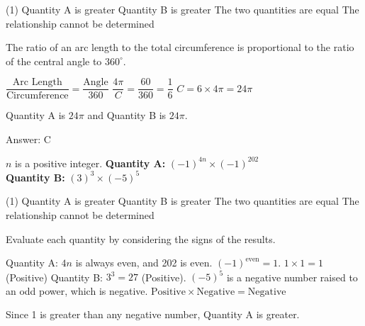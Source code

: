 \documentclass[11pt,paper=a4,answers]{exam}
\begin{document}
\begin{questions}
\begin{tasks}(1)
\task[A)] Quantity A is greater
\task[B)] Quantity B is greater
\task[C)] The two quantities are equal
\task[D)] The relationship cannot be determined
\end{tasks}

\begin{solution}
The ratio of an arc length to the total circumference is proportional to the ratio of the central angle to $360^\circ$.
\vspace{5pt}
\begin{center}
$\dfrac{\text{Arc Length}}{\text{Circumference}} = \dfrac{\text{Angle}}{360}$
\vspace{5pt}
$\dfrac{4\pi}{C} = \dfrac{60}{360} = \dfrac{1}{6}$
\vspace{5pt}
$C = 6 \times 4\pi = 24\pi$
\end{center}
\vspace{5pt}
Quantity A is $24\pi$ and Quantity B is $24\pi$.

Answer: \colorbox{yellow!100}{C}
\end{solution}

\vspace{1cm}

\question
$n$ is a positive integer.
\vspace{5pt}
\textbf{Quantity A: } $(-1)^{4n} \times (-1)^{202}$ \\
\vspace{5pt}
\textbf{Quantity B: } $(3)^3 \times (-5)^5$

\begin{tasks}(1)
\task[A)] Quantity A is greater
\task[B)] Quantity B is greater
\task[C)] The two quantities are equal
\task[D)] The relationship cannot be determined
\end{tasks}

\begin{solution}
Evaluate each quantity by considering the signs of the results.
\vspace{5pt}
\begin{center}
Quantity A: $4n$ is always even, and 202 is even. $(-1)^{\text{even}} = 1$.
\vspace{5pt}
$1 \times 1 = 1$ (Positive)
\vspace{10pt}
Quantity B: $3^3 = 27$ (Positive). $(-5)^5$ is a negative number raised to an odd power, which is negative.
\vspace{5pt}
$\text{Positive} \times \text{Negative} = \text{Negative}$
\end{center}
\vspace{5pt}
Since 1 is greater than any negative number, Quantity A is greater.


\end{solution}
\end{questions}
\end{document}
